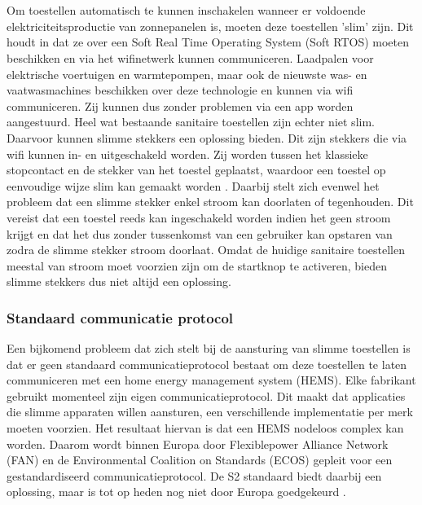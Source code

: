 \section{}%
\label{sec:Slimme toestellen aansturen}

Om toestellen automatisch te kunnen inschakelen wanneer er voldoende elektriciteitsproductie van zonnepanelen is, moeten deze toestellen 'slim' zijn. Dit houdt in dat ze over een Soft Real Time Operating System (Soft RTOS) moeten beschikken en via het wifinetwerk kunnen communiceren. Laadpalen voor elektrische voertuigen en warmtepompen, maar ook de nieuwste was- en vaatwasmachines beschikken over deze technologie en kunnen via wifi communiceren. Zij kunnen dus zonder problemen via een app worden aangestuurd. Heel wat bestaande sanitaire toestellen zijn echter niet slim. Daarvoor kunnen slimme stekkers een oplossing bieden. Dit zijn stekkers die via wifi kunnen in- en uitgeschakeld worden. Zij worden tussen het klassieke stopcontact en de stekker van het toestel geplaatst, waardoor een toestel op eenvoudige wijze slim kan gemaakt worden \autocite{Jong2020}. Daarbij stelt zich evenwel het probleem dat een slimme stekker enkel stroom kan doorlaten of tegenhouden. Dit vereist dat een toestel reeds kan ingeschakeld worden indien het geen stroom krijgt en dat het dus zonder tussenkomst van een gebruiker kan opstaren van zodra de slimme stekker stroom doorlaat. Omdat de huidige sanitaire toestellen meestal van stroom moet voorzien zijn om de startknop te activeren, bieden slimme stekkers dus niet altijd een oplossing. \\

\subsubsection{Standaard communicatie protocol}

Een bijkomend probleem dat zich stelt bij de aansturing van slimme toestellen is dat er geen standaard communicatieprotocol bestaat om deze toestellen te laten communiceren met een home energy management system (HEMS). Elke fabrikant gebruikt momenteel zijn eigen communicatieprotocol. Dit maakt dat applicaties die slimme apparaten willen aansturen, een verschillende implementatie per merk moeten voorzien. Het resultaat hiervan is dat een HEMS nodeloos complex kan worden. Daarom wordt binnen Europa door Flexiblepower Alliance Network (FAN) en de Environmental Coalition on Standards (ECOS) gepleit voor een gestandardiseerd communicatieprotocol. De S2 standaard biedt daarbij een oplossing, maar is tot op heden nog niet door Europa goedgekeurd \autocite{Konsman2023a}.